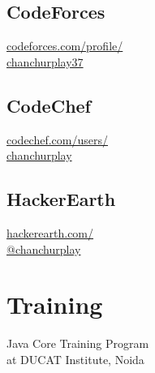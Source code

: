 \documentclass[]{hieudo-build}
\begin{document}
\begin{minipage}[t]{0.3\textwidth}
\subsection{CodeForces}
	\href{http://codeforces.com/profile/chanchurplay37}{codeforces.com/profile/\\chanchurplay37}\\
\subsection{CodeChef} \href{https://www.codechef.com/users/chanchurplay}{codechef.com/users/\\chanchurplay} \\
\subsection{HackerEarth} \href{https://www.hackerearth.com/@chanchurplay}{hackerearth.com/\\@chanchurplay} \\

\sectionsep



\section{Training}
Java Core Training Program\\
at DUCAT Institute, Noida \\
\sectionsep


\end{minipage}
\end{document}
